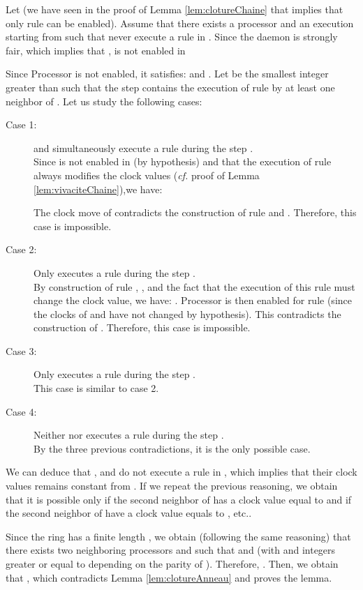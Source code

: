 \documentclass[11pt,english,letterpaper]{article}
\newenvironment{proof}{{\noindent\bf Proof. } }{{\hfill }}
\begin{document}
\begin{proof}
Let  (we have seen in the proof of Lemma \ref{lem:clotureChaine} that implies that only rule  can be enabled). Assume that there exists a processor  and an execution  starting from  such that  never execute a rule in . Since the daemon is strongly fair, which implies that ,  is not enabled in 

Since Processor  is not enabled, it satisfies:  and . Let  be the smallest integer greater than  such that the step  contains the execution of rule by at least one neighbor of . Let us study the following cases:

\begin{description}
\item[Case 1:]  and  simultaneously execute a rule during the step .\\
Since  is not enabled in  (by hypothesis) and that the execution of rule  always modifies the clock values (\emph{cf.}	proof of Lemma \ref{lem:vivaciteChaine}),we have: 

The clock move of  contradicts the construction of rule  and . Therefore, this case is impossible.

\item[Case 2:] Only  executes a rule during the step .\\
By construction of rule , , and the fact that the execution of this rule must change the clock value, we have: . Processor  is then enabled for rule  (since the clocks of  and  have not changed by hypothesis). This contradicts the construction of . Therefore, this case is impossible.

\item[Case 3:] Only  executes a rule during the step .\\
This case is similar to case 2.

\item[Case 4:] Neither  nor  executes a rule during the step .\\
By the three previous contradictions, it is the only possible case.
\end{description}

We can deduce that ,  and  do not execute a rule in , which implies that their clock values remains constant from . If we repeat the previous reasoning, we obtain that it is possible only if the second neighbor of  has a clock value equal to  and if the second neighbor of  have a clock value equals to , etc..

Since the ring has a finite length , we obtain (following the same reasoning) that there exists two neighboring processors  and  such that   and  (with   and  integers greater or equal to  depending on the parity of ). Therefore, . Then, we obtain that , which contradicts Lemma \ref{lem:clotureAnneau} and proves the lemma.
\end{proof}
\end{document}
